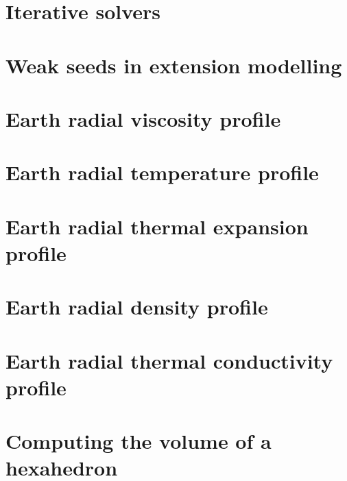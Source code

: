 \section{Iterative solvers \label{ss:itsolvers}}  %
\newpage %
\section{Weak seeds in extension modelling \label{ss:weakseeds}}  %
\newpage %
\section{Earth radial viscosity profile \label{ss:viscprof}}  %
\newpage %
\section{Earth radial temperature profile \label{ss:adiab}}  %
\newpage %
\section{Earth radial thermal expansion profile}  %
\newpage %
\section{Earth radial density profile}  %
\newpage %
\section{Earth radial thermal conductivity profile}  %
\newpage %
\section{Computing the volume of a hexahedron}  %
\newpage %
